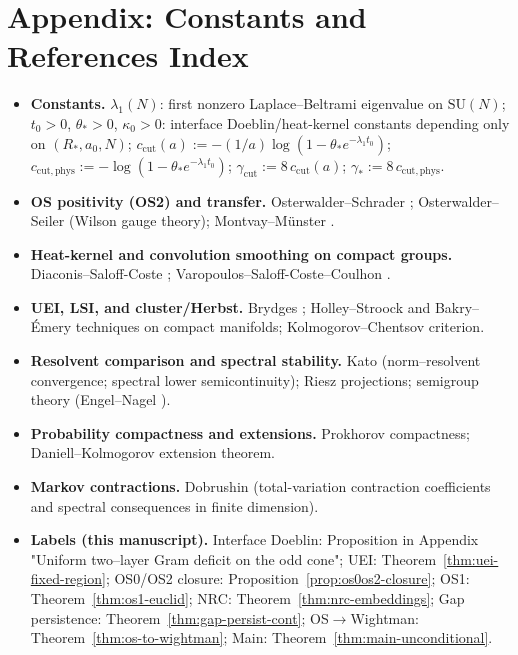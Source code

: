 \documentclass[11pt]{amsart}
\theoremstyle{plain}
\theoremstyle{definition}
\theoremstyle{remark}
\begin{document}
\section*{Appendix: Constants and References Index}
\begin{itemize}
  \item \textbf{Constants.} $\lambda_1(N)$: first nonzero Laplace--Beltrami eigenvalue on $\mathrm{SU}(N)$; $t_0>0$, $\theta_*>0$, $\kappa_0>0$: interface Doeblin/heat-kernel constants depending only on $(R_*,a_0,N)$; $c_{\mathrm{cut}}(a):=-(1/a)\log(1-\theta_* e^{-\lambda_1 t_0})$; $c_{\mathrm{cut,phys}}:= -\log(1-\theta_* e^{-\lambda_1 t_0})$; $\gamma_{\mathrm{cut}}:=8\,c_{\mathrm{cut}}(a)$; $\gamma_*:=8\,c_{\mathrm{cut,phys}}$.
  \item \textbf{OS positivity (OS2) and transfer.} Osterwalder--Schrader \cite{Osterwalder1973,Osterwalder1975}; Osterwalder--Seiler \cite{OsterwalderSeiler1978} (Wilson gauge theory); Montvay--M\"unster \cite{MontvayMunster1994}.
  \item \textbf{Heat-kernel and convolution smoothing on compact groups.} Diaconis--Saloff-Coste \cite{DiaconisSaloffCoste2004}; Varopoulos--Saloff-Coste--Coulhon \cite{VaropoulosSaloffCosteCoulhon1992}.
  \item \textbf{UEI, LSI, and cluster/Herbst.} Brydges \cite{Brydges1978,Brydges1986}; Holley--Stroock and Bakry--\'Emery techniques on compact manifolds; Kolmogorov--Chentsov criterion.
  \item \textbf{Resolvent comparison and spectral stability.} Kato \cite{Kato1995} (norm--resolvent convergence; spectral lower semicontinuity); Riesz projections; semigroup theory (Engel--Nagel \cite{EngelNagel2000}).
  \item \textbf{Probability compactness and extensions.} Prokhorov compactness; Daniell--Kolmogorov extension theorem.
  \item \textbf{Markov contractions.} Dobrushin \cite{Dobrushin1970} (total-variation contraction coefficients and spectral consequences in finite dimension).
  \item \textbf{Labels (this manuscript).} Interface Doeblin: Proposition in Appendix "Uniform two--layer Gram deficit on the odd cone"; UEI: Theorem~\ref{thm:uei-fixed-region}; OS0/OS2 closure: Proposition~\ref{prop:os0os2-closure}; OS1: Theorem~\ref{thm:os1-euclid}; NRC: Theorem~\ref{thm:nrc-embeddings}; Gap persistence: Theorem~\ref{thm:gap-persist-cont}; OS$\to$Wightman: Theorem~\ref{thm:os-to-wightman}; Main: Theorem~\ref{thm:main-unconditional}.
\end{itemize}
\end{document}

